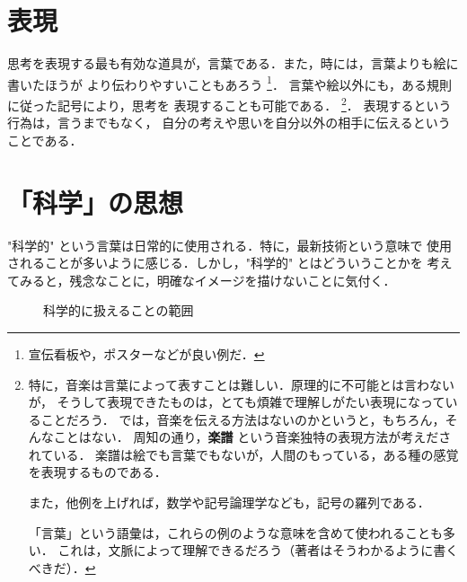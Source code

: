         \section{表現}
            思考を表現する最も有効な道具が，言葉である．また，時には，言葉よりも絵に書いたほうが
            より伝わりやすいこともあろう
                \footnote{
                    宣伝看板や，ポスターなどが良い例だ．
                }．
            言葉や絵以外にも，ある規則に従った記号により，思考を
            表現することも可能である．
                \footnote{
                    特に，音楽は言葉によって表すことは難しい．原理的に不可能とは言わないが，
                    そうして表現できたものは，とても煩雑で理解しがたい表現になっていることだろう．
                    では，音楽を伝える方法はないのかというと，もちろん，そんなことはない．
                    周知の通り，\textbf{楽譜} という音楽独特の表現方法が考えだされている．
                    楽譜は絵でも言葉でもないが，人間のもっている，ある種の感覚を表現するものである．

                    また，他例を上げれば，数学や記号論理学なども，記号の羅列である．

                    「言葉」という語彙は，これらの例のような意味を含めて使われることも多い．
                    これは，文脈によって理解できるだろう（著者はそうわかるように書くべきだ）．
                }．
            表現するという行為は，言うまでもなく，
            自分の考えや思いを自分以外の相手に伝えるということである．

        \section{「科学」の思想}
            "科学的" という言葉は日常的に使用される．特に，最新技術という意味で
            使用されることが多いように感じる．しかし，"科学的" とはどういうことかを
            考えてみると，残念なことに，明確なイメージを描けないことに気付く．

            \begin{figure}[hbt]
                \begin{center}
                    \caption{科学的に扱えることの範囲}
                    \label{fig:ThomomExpElec001}
                \end{center}
            \end{figure}

